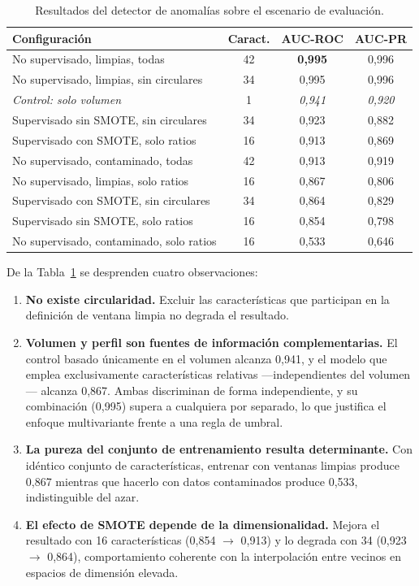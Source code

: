 \begin{table}[H]
\centering
\begin{tabular}{|l|c|c|c|}
\hline
\textbf{Configuración} & \textbf{Caract.} & \textbf{AUC-ROC} & \textbf{AUC-PR} \\
\hline
No supervisado, limpias, todas & 42 & \textbf{0{,}995} & 0{,}996 \\
No supervisado, limpias, sin circulares & 34 & 0{,}995 & 0{,}996 \\
\textit{Control: solo volumen} & 1 & \textit{0{,}941} & \textit{0{,}920} \\
Supervisado sin SMOTE, sin circulares & 34 & 0{,}923 & 0{,}882 \\
Supervisado con SMOTE, solo ratios & 16 & 0{,}913 & 0{,}869 \\
No supervisado, contaminado, todas & 42 & 0{,}913 & 0{,}919 \\
No supervisado, limpias, solo ratios & 16 & 0{,}867 & 0{,}806 \\
Supervisado con SMOTE, sin circulares & 34 & 0{,}864 & 0{,}829 \\
Supervisado sin SMOTE, solo ratios & 16 & 0{,}854 & 0{,}798 \\
No supervisado, contaminado, solo ratios & 16 & 0{,}533 & 0{,}646 \\
\hline
\end{tabular}
\caption{Resultados del detector de anomalías sobre el escenario de evaluación.}
\label{tab:anomalias}
\end{table}

De la Tabla~\ref{tab:anomalias} se desprenden cuatro observaciones:

\begin{enumerate}
    \item \textbf{No existe circularidad.} Excluir las características que participan en la
    definición de ventana limpia no degrada el resultado.

    \item \textbf{Volumen y perfil son fuentes de información complementarias.} El control
    basado únicamente en el volumen alcanza 0,941, y el modelo que emplea exclusivamente
    características relativas —independientes del volumen— alcanza 0,867. Ambas discriminan de
    forma independiente, y su combinación (0,995) supera a cualquiera por separado, lo que
    justifica el enfoque multivariante frente a una regla de umbral.

    \item \textbf{La pureza del conjunto de entrenamiento resulta determinante.} Con idéntico
    conjunto de características, entrenar con ventanas limpias produce 0,867 mientras que
    hacerlo con datos contaminados produce 0,533, indistinguible del azar.

    \item \textbf{El efecto de SMOTE depende de la dimensionalidad.} Mejora el resultado con
    16 características (0,854 $\rightarrow$ 0,913) y lo degrada con 34 (0,923 $\rightarrow$
    0,864), comportamiento coherente con la interpolación entre vecinos en espacios de
    dimensión elevada.
\end{enumerate}


